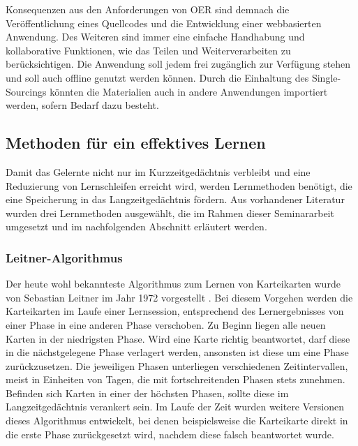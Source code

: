 Konsequenzen aus den Anforderungen von OER sind demnach die Veröffentlichung eines Quellcodes und die Entwicklung einer webbasierten Anwendung. Des Weiteren sind immer eine einfache Handhabung und kollaborative Funktionen, wie das Teilen und Weiterverarbeiten zu berücksichtigen. Die Anwendung soll jedem frei zugänglich zur Verfügung stehen und soll auch offline genutzt werden können. Durch die Einhaltung des Single-Sourcings könnten die Materialien auch in andere Anwendungen importiert werden, sofern Bedarf dazu besteht.


\subsection{Methoden für ein effektives Lernen}
Damit das Gelernte nicht nur im Kurzzeitgedächtnis verbleibt und eine Reduzierung von Lernschleifen erreicht wird, werden Lernmethoden benötigt, die eine Speicherung in das Langzeitgedächtnis fördern. Aus vorhandener Literatur wurden drei Lernmethoden ausgewählt, die im Rahmen dieser Seminararbeit umgesetzt und im nachfolgenden Abschnitt erläutert werden.

\subsubsection{Leitner-Algorithmus}
Der heute wohl bekannteste Algorithmus zum Lernen von Karteikarten wurde von Sebastian Leitner im Jahr 1972 vorgestellt \cite{SebastianLeitner.1972}. Bei diesem Vorgehen werden die Karteikarten im Laufe einer Lernsession, entsprechend des Lernergebnisses von einer Phase in eine anderen Phase verschoben. Zu Beginn liegen alle neuen Karten in der niedrigsten Phase. Wird eine Karte richtig beantwortet, darf diese in die nächstgelegene Phase verlagert werden, ansonsten ist diese um eine Phase zurückzusetzen. Die jeweiligen Phasen unterliegen verschiedenen Zeitintervallen, meist in Einheiten von Tagen, die mit fortschreitenden Phasen stets zunehmen. Befinden sich Karten in einer der höchsten Phasen, sollte diese im Langzeitgedächtnis verankert sein. Im  Laufe der Zeit wurden weitere Versionen dieses Algorithmus entwickelt, bei denen beispielsweise die Karteikarte direkt in die erste Phase zurückgesetzt wird, nachdem diese falsch beantwortet wurde.

